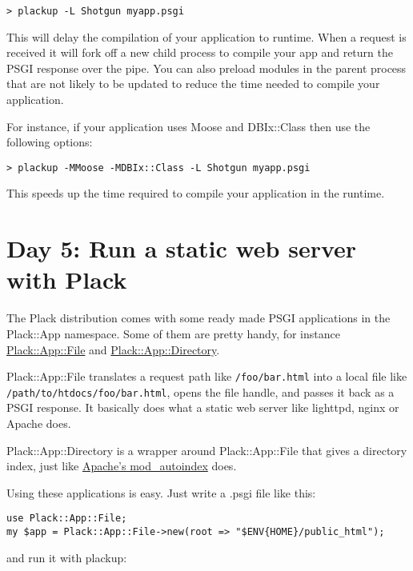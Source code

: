 \begin{lstlisting}
> plackup -L Shotgun myapp.psgi
\end{lstlisting}

This will delay the compilation of your application to runtime. When a
request is received it will fork off a new child process to compile your
app and return the PSGI response over the pipe. You can also preload
modules in the parent process that are not likely to be updated to
reduce the time needed to compile your application.

For instance, if your application uses Moose and DBIx::Class then use
the following options:

\begin{lstlisting}
> plackup -MMoose -MDBIx::Class -L Shotgun myapp.psgi
\end{lstlisting}

This speeds up the time required to compile your application in the
runtime.

\chapter{Day 5: Run a static web server with
Plack}\label{day-5-run-a-static-web-server-with-plack}

The Plack distribution comes with some ready made PSGI applications in
the Plack::App namespace. Some of them are pretty handy, for instance
\href{http://search.cpan.org/perldoc?Plack::App::File}{Plack::App::File}
and
\href{http://search.cpan.org/perldoc?Plack::App::Directory}{Plack::App::Directory}.

Plack::App::File translates a request path like
\lstinline!/foo/bar.html! into a local file like
\lstinline!/path/to/htdocs/foo/bar.html!, opens the file handle, and
passes it back as a PSGI response. It basically does what a static web
server like lighttpd, nginx or Apache does.

Plack::App::Directory is a wrapper around Plack::App::File that gives a
directory index, just like
\href{http://httpd.apache.org/docs/2.0/mod/mod_autoindex.html}{Apache's
mod\_autoindex} does.

Using these applications is easy. Just write a .psgi file like this:

\begin{lstlisting}
use Plack::App::File;
my $app = Plack::App::File->new(root => "$ENV{HOME}/public_html");
\end{lstlisting}

and run it with plackup:

